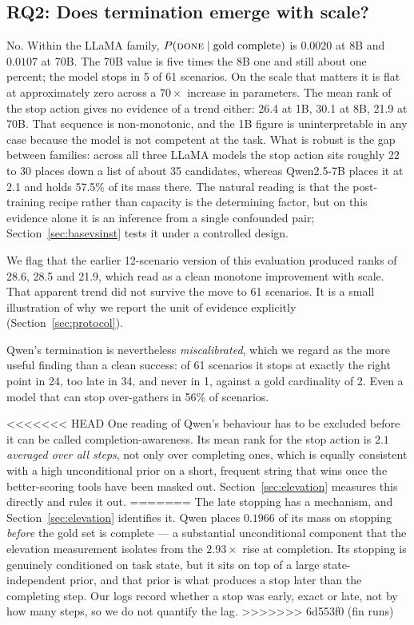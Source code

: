 \documentclass[11pt]{article}
\newcommand{\done}{\ensuremath{\text{\textsc{done}}}}
\begin{document}
\subsection{RQ2: Does termination emerge with scale?}

No. Within the LLaMA family, $P(\done \mid \text{gold complete})$ is $0.0020$ at
8B and $0.0107$ at 70B. The 70B value is five times the 8B one and still about one
percent; the model stops in 5 of 61 scenarios. On the scale that matters it is flat
at approximately zero across a $70\times$ increase in parameters. The mean rank of the stop
action gives no evidence of a trend either: 26.4 at 1B, 30.1 at 8B, 21.9 at 70B.
That sequence is non-monotonic, and the 1B figure is uninterpretable in any case
because the model is not competent at the task. What is robust is the gap between
families: across all three LLaMA models the stop action sits roughly 22 to 30
places down a list of about 35 candidates, whereas Qwen2.5-7B places it at 2.1 and
holds 57.5\% of its mass there. The natural reading is that the post-training
recipe rather than capacity is the determining factor, but on this evidence alone
it is an inference from a single confounded pair; Section~\ref{sec:basevsinst}
tests it under a controlled design.

We flag that the earlier 12-scenario version of this evaluation produced ranks of
28.6, 28.5 and 21.9, which read as a clean monotone improvement with scale. That
apparent trend did not survive the move to 61 scenarios. It is a small
illustration of why we report the unit of evidence explicitly
(Section~\ref{sec:protocol}).

Qwen's termination is nevertheless \emph{miscalibrated}, which we regard as the
more useful finding than a clean success: of 61 scenarios it stops at exactly the
right point in 24, too late in 34, and never in 1, against a gold cardinality of 2.
Even a model that can stop over-gathers in 56\% of scenarios.

<<<<<<< HEAD
One reading of Qwen's behaviour has to be excluded before it can be called
completion-awareness. Its mean rank for the stop action is $2.1$ \emph{averaged
over all steps}, not only over completing ones, which is equally consistent with a
high unconditional prior on a short, frequent string that wins once the
better-scoring tools have been masked out. Section~\ref{sec:elevation} measures
this directly and rules it out.
=======
The late stopping has a mechanism, and Section~\ref{sec:elevation} identifies it.
Qwen places $0.1966$ of its mass on stopping \emph{before} the gold set is
complete --- a substantial unconditional component that the elevation measurement
isolates from the $2.93\times$ rise at completion. Its stopping is genuinely
conditioned on task state, but it sits on top of a large state-independent prior,
and that prior is what produces a stop later than the completing step. Our logs
record whether a stop was early, exact or late, not by how many steps, so we do
not quantify the lag.
>>>>>>> 6d553f0 (fin runs)
\end{document}
